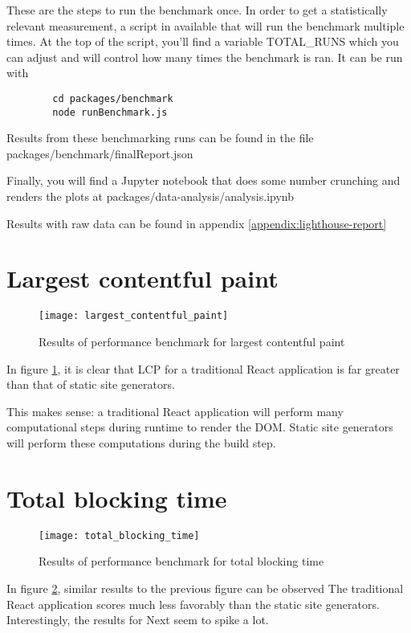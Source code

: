 These are the steps to run the benchmark once. In order to get a statistically relevant measurement, a script in available that will run the benchmark multiple times.
At the top of the script, you'll find a variable TOTAL\_RUNS which you can adjust and will control how many times the benchmark is ran.
It can be run with

\begin{verbatim}
		cd packages/benchmark
		node runBenchmark.js
\end{verbatim}

Results from these benchmarking runs can be found in the file packages/benchmark/finalReport.json

Finally, you will find a Jupyter notebook that does some number crunching and renders the plots at packages/data-analysis/analysis.ipynb

Results with raw data can be found in appendix \ref{appendix:lighthouse-report}

\section{Largest contentful paint}

\begin{figure}[htb!]
	\texttt{[image: largest\_contentful\_paint]}{}
	\caption{Results of performance benchmark for largest contentful paint}
	\label{fig:largest_contentful_paint}
\end{figure}

In figure \ref{fig:largest_contentful_paint}, it is clear that LCP for a traditional React application is far greater than that of static site generators.

This makes sense: a traditional React application will perform many computational steps during runtime to render the DOM.
Static site generators will perform these computations during the build step.

\section{Total blocking time}


\begin{figure}[htb!]
	\texttt{[image: total\_blocking\_time]}
	\caption{Results of performance benchmark for total blocking time}
	\label{fig:total_blocking_time}
\end{figure}

In figure \ref{fig:total_blocking_time}, similar results to the previous figure can be observed
The traditional React application scores much less favorably than the static site generators.
Interestingly, the results for Next seem to spike a lot.


